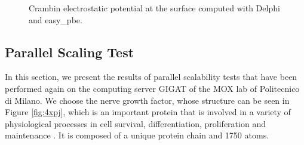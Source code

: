 \documentclass[11pt,a4paper]{article}
\begin{document}
\begin{figure}[H]
{    }
    \quad
    \caption[]{Crambin electrostatic potential at the surface computed with Delphi and easy\_pbe.}
    \label{fig:delphi_vs_easypbe_1ccm}
\end{figure}


\subsection{Parallel Scaling Test}
\label{sec:scaling}
In this section, we present the results of parallel scalability tests that have been performed again on the computing server GIGAT
of the MOX lab of Politecnico di Milano. We choose the nerve growth factor, whose structure can be seen in Figure \ref{fig:4xpj}, which is an important protein that is involved in a variety of physiological processes in cell survival, differentiation, proliferation and maintenance \cite{4xpj, 4xpj2}. It is composed of a unique protein chain and 1750 atoms. 
\end{document}
